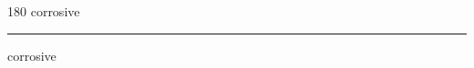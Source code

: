 
\begin{frame}
\begin{center}
\begin{turn}{180}
{\fontsize{2.5cm}{1em}\selectfont corrosive}
\end{turn}
\vspace{1em}\par  
\hrule
\vspace{1em}\par  
{\fontsize{2.5cm}{1em}\selectfont corrosive}
\end{center}
\end{frame}
